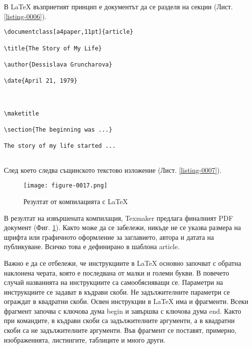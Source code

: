В LaTeX възприетият принцип е документът да се разделя на секции (Лист. \ref{listing-0006}).

\begin{lstlisting}[language={[LaTeX]TeX}, caption=Текстово изложение, label=listing-0007]
\documentclass[a4paper,11pt]{article}

\title{The Story of My Life}

\author{Dessislava Gruncharova}

\date{April 21, 1979}



\maketitle

\section{The beginning was ...}

The story of my life started ...


\end{lstlisting}

След което следва същинското текстово изложение (Лист. \ref{listing-0007}).

\begin{figure}
  \centering
  \texttt{[image: figure-0017.png]}
  \caption{Резултат от компилацията с LaTeX}
\label{figure-0017}
\end{figure}

В резултат на извършената компилация, Texmaker предлага финалният PDF документ (Фиг. \ref{figure-0017}). Както може да се забележи, никъде не се указва размера на шрифта или графичното оформление за заглавието, автора и датата на публикуване. Всичко това е дефинирано в шаблона article. 

Важно е да се отбележи, че инструкциите в LaTeX основно започват с обратна наклонена черата, която е последвана от малки и големи букви. В повечето случай названията на инструкциите са самообясняващи се. Параметри на инструкциите се задават в къдрави скоби. Не задължителните параметри се ограждат в квадратни скоби. Освен инструкции в LaTeX има и фрагменти. Всеки фрагмент започва с ключова дума begin и завършва с ключова дума end. Както при командите, в къдрави скоби са задължителните аргументи, а в квадратни скоби са не задължителните аргументи. Във фрагмент се поставят, примерно, изображенията, листингите, таблиците и много други. 

